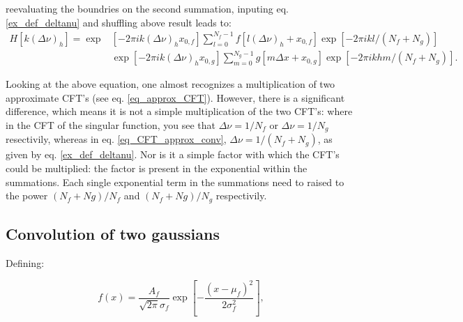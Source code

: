 reevaluating the boundries on the second summation, inputing eq. \eqref{ex_def_deltanu} and shuffling above result leads to:
\begin{equation}\label{eq_CFT_approx_conv}
\begin{aligned}
H[k(\Delta\nu)_h] = \operatorname{exp}&[-2\pi i k(\Delta\nu)_h x_{0,f}] \sum_{l=0}^{N_f-1} f[l(\Delta\nu)_h + x_{0,f}]\operatorname{exp}[-2\pi i k l/(N_f+N_g)] \\
& \operatorname{exp}[-2\pi i k(\Delta\nu)_h x_{0,g}]  \sum_{m=0}^{N_g-1}g[m\Delta x + x_{0,g}] \operatorname{exp}[-2\pi i kh m/(N_f+N_g)].
\end{aligned}
\end{equation}

Looking at the above equation, one almost recognizes a multiplication of two approximate CFT's (see eq. \eqref{eq_approx_CFT}). However, there is a significant difference, which means it is not a simple multiplication of the two CFT's: where in the CFT of the singular function, you see that $\Delta\nu = 1/N_f$ or $\Delta\nu = 1/N_g$ resectivily, whereas in eq. \eqref{eq_CFT_approx_conv}, $\Delta\nu = 1/(N_f + N_g)$, as given by eq. \eqref{ex_def_deltanu}. Nor is it a simple factor with which the CFT's could be multiplied: the factor is present in the exponential within the summations. Each single exponential term in the summations need to raised to the power $(N_f+Ng)/N_f$ and $(N_f+Ng)/N_g$ respectivily.%







\subsection{Convolution of two gaussians}
Defining:

\begin{equation}\label{eq_def_gauss}
f(x)=\frac{A_{f}}{\sqrt{2\pi}\sigma_f} \exp{\left[-\frac{\left(x-\mu_{f}\right)^{2}}{2 \sigma_{f}^{2}}\right]},
\end{equation}

